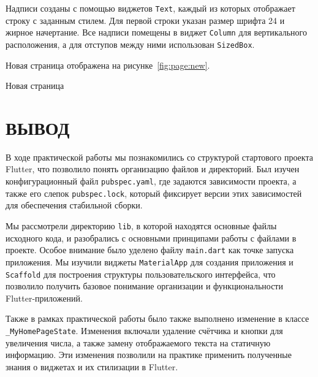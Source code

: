 Надписи созданы с помощью виджетов \texttt{Text},
каждый из которых отображает строку с заданным стилем.
Для первой строки указан размер шрифта 24 и жирное начертание.
Все надписи помещены в виджет \texttt{Column} для вертикального расположения,
а для отступов между ними использован \texttt{SizedBox}.\par
Новая страница отображена на рисунке~\ref{fig:page:new}.

\begin{image}
	\caption{Новая страница}
	\label{fig:page:new}
\end{image}

\clearpage

\section*{ВЫВОД}

В ходе практической работы мы познакомились
со структурой стартового проекта Flutter,
что позволило понять организацию файлов и директорий.
Был изучен конфигурационный файл \texttt{pubspec.yaml},
где задаются зависимости проекта, а также его слепок \texttt{pubspec.lock},
который фиксирует версии этих зависимостей
для обеспечения стабильной сборки.\par
Мы рассмотрели директорию \texttt{lib},
в которой находятся основные файлы исходного кода,
и разобрались с основными принципами работы с файлами в проекте.
Особое внимание было уделено файлу \texttt{main.dart}
как точке запуска приложения.
Мы изучили виджеты \texttt{MaterialApp} для создания приложения
и \texttt{Scaffold} для построения структуры пользовательского интерфейса,
что позволило получить базовое понимание организации
и функциональности Flutter-приложений.\par
Также в рамках практической работы было также выполнено изменение
в классе \texttt{\_MyHomePageState}.
Изменения включали удаление счётчика и кнопки для увеличения числа,
а также замену отображаемого текста на статичную информацию.
Эти изменения позволили на практике применить полученные знания о виджетах
и их стилизации в Flutter.

